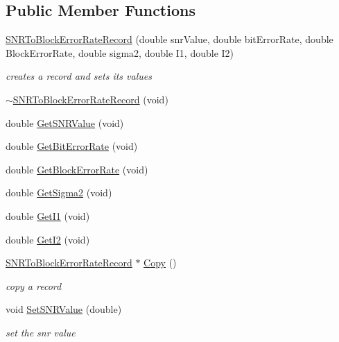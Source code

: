 \subsection*{Public Member Functions}
\begin{DoxyCompactItemize}
\item 
\hyperlink{classns3_1_1SNRToBlockErrorRateRecord_af67fb8a00779622a9a5f38bdceb0ac43}{S\+N\+R\+To\+Block\+Error\+Rate\+Record} (double snr\+Value, double bit\+Error\+Rate, double Block\+Error\+Rate, double sigma2, double I1, double I2)
\begin{DoxyCompactList}\small\item\em creates a record and sets its values \end{DoxyCompactList}\item 
\hyperlink{classns3_1_1SNRToBlockErrorRateRecord_ac9657d7423e71d0730c3d8bc7ef49ddb}{$\sim$\+S\+N\+R\+To\+Block\+Error\+Rate\+Record} (void)
\item 
double \hyperlink{classns3_1_1SNRToBlockErrorRateRecord_a94101da17649ce4524759837748c8dc4}{Get\+S\+N\+R\+Value} (void)
\item 
double \hyperlink{classns3_1_1SNRToBlockErrorRateRecord_a9d5f262e35d6f728165d94339a60821b}{Get\+Bit\+Error\+Rate} (void)
\item 
double \hyperlink{classns3_1_1SNRToBlockErrorRateRecord_a11d0591c5b0d573e1e95163114c7baa3}{Get\+Block\+Error\+Rate} (void)
\item 
double \hyperlink{classns3_1_1SNRToBlockErrorRateRecord_aa8242e2cf930de1cbab8abcb1cf1ba08}{Get\+Sigma2} (void)
\item 
double \hyperlink{classns3_1_1SNRToBlockErrorRateRecord_a2a833cbf0a6c0b7d7711b8b9e80cb374}{Get\+I1} (void)
\item 
double \hyperlink{classns3_1_1SNRToBlockErrorRateRecord_ad074a70a83bbbfdb5e0cbaa7d652e3f0}{Get\+I2} (void)
\item 
\hyperlink{classns3_1_1SNRToBlockErrorRateRecord}{S\+N\+R\+To\+Block\+Error\+Rate\+Record} $\ast$ \hyperlink{classns3_1_1SNRToBlockErrorRateRecord_aef7a4295af5c7fcdbc2ab4ee470cf20c}{Copy} ()
\begin{DoxyCompactList}\small\item\em copy a record \end{DoxyCompactList}\item 
void \hyperlink{classns3_1_1SNRToBlockErrorRateRecord_a1fdbdc0bc9e650e122a26bbf641879ab}{Set\+S\+N\+R\+Value} (double)
\begin{DoxyCompactList}\small\item\em set the snr value \end{DoxyCompactList}\item 

\end{DoxyCompactItemize}
